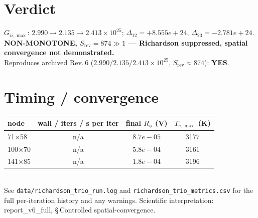 \documentclass[11pt]{article}
\begin{document}
\section*{Verdict}
$G_{ii,\max}$: $2.990 \to 2.135 \to 2.413 \times10^{25}$; $\Delta_{12}=+8.555e+24$, $\Delta_{23}=-2.781e+24$.
\textbf{NON-MONOTONE, $S_{\mathrm{rev}}=874\gg1$ --- Richardson suppressed, spatial convergence not demonstrated.}\\[2pt]
Reproduces archived Rev.\,6 ($2.990/2.135/2.413\times10^{25}$, $S_{\mathrm{rev}}\approx874$):
\textbf{YES}.
\section*{Timing / convergence}
\begin{tabular}{lccc}\toprule
node & wall / iters / s per iter & final $R_\phi$ (V) & $T_{e,\max}$ (K) \\ \midrule
71$\times$58 & n/a & $8.7e-05$ & 3177 \\
100$\times$70 & n/a & $5.8e-04$ & 3161 \\
141$\times$85 & n/a & $1.8e-04$ & 3196 \\
\bottomrule\end{tabular}\\[4pt]
See \texttt{data/richardson\_trio\_run.log} and \texttt{richardson\_trio\_metrics.csv} for the full
per-iteration history and any warnings. Scientific interpretation: report\_v6\_full, \S\,Controlled
spatial-convergence.
\end{document}
